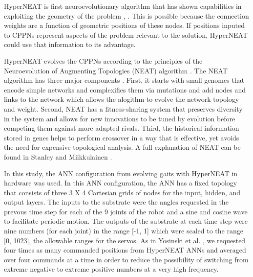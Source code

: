 HyperNEAT is first neuroevolutionary algorithm that has shown capabilities in exploiting the geometry of the problem \cite{stanley1}, \cite{clune3}.
This is possible because the connection weights are a function of geometric positions of these nodes. 
If positions inputed to CPPNs represent aspects of the problem relevant to the solution, HyperNEAT could use that information to its advantage.  


HyperNEAT evolves the CPPNs according to the principles of the Neuroevolution of Augmenting Topologies (NEAT) algorithm \cite{stanley4}. 
The NEAT algorithm has three major components \cite{stanley4}. 
First, it starts with small genomes that encode simple networks and complexifies them via mutations and add nodes and links to the network which allows the alogithm to evolve the network topology and weight. 
Second, NEAT has a fitness-sharing system that preserves diversity in the system and allows for new innovations to be tuned by evolution before competing them against more adapted rivals. 
Third, the historical information stored in genes helps to perform crossover in a way that is effective, yet avoids the need for expensive topological analysis. A full explanation of NEAT can be found in Stanley and Miikkulainen \cite{stanley4}. 


In this study, the ANN configuration from evolving gaits with HyperNEAT in hardware \cite{yos:clune} was used. 
In this ANN configuration, the ANN has a fixed topology that consists of three 3 X 4 Cartesian grids of nodes for the input, hidden, and output layers. 
The inputs to the substrate were the angles requested in the prevous time step for each of the 9 joints of the robot and a sine and cosine wave to facilitate periodic motion. 
The outputs of the substrate at each time step were nine numbers (for each joint) in the range [-1, 1] which were scaled to the range [0, 1023], the allowable ranges for the servos. 
As in Yosinski et al. \cite{yos:clune}, we requested four times as many commanded positions from HyperNEAT ANNs and averaged over four commands at a time in order to reduce the possibility of switching from extreme negative to extreme positive numbers at a very high frequency. 



